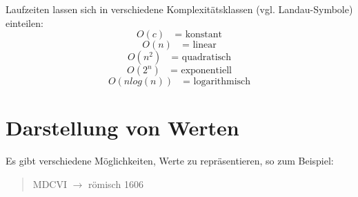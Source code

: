 \documentclass{report}
\begin{document}
Laufzeiten lassen sich in verschiedene Komplexitätsklassen (vgl. Landau-Symbole) einteilen:
\begin{equation}O(c) \quad\mbox{= konstant}\end{equation}
\begin{equation}O(n) \quad\mbox{= linear}\end{equation}
\begin{equation}O(n^2) \quad\mbox{= quadratisch}\end{equation}
\begin{equation}O(2^n) \quad\mbox{= exponentiell}\end{equation}
\begin{equation}O(n log(n)) \quad\mbox{= logarithmisch}\end{equation}

\newpage
\section{Darstellung von Werten}
Es gibt verschiedene Möglichkeiten, Werte zu repräsentieren, so zum Beispiel:
\begin{quote}MDCVI $\to$ römisch 1606\end{quote}
\end{document}

